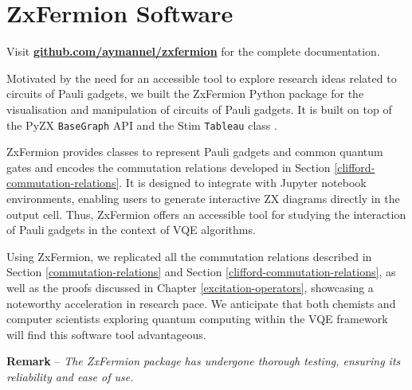 \chapter{ZxFermion Software}%
\label{zxfermion}

Visit \textbf{\href{https://github.com/aymannel/zxfermion}{github.com/aymannel/zxfermion} }for the complete documentation.

Motivated by the need for an accessible tool to explore research ideas related to circuits of Pauli gadgets, we built the ZxFermion Python package for the visualisation and manipulation of circuits of Pauli gadgets. It is built on top of the PyZX \lstinline{BaseGraph} API \cite{Kissinger2020} and the Stim \lstinline{Tableau} class \cite{Gidney2021}.

ZxFermion provides classes to represent Pauli gadgets and common quantum gates and encodes the commutation relations developed in Section \ref{clifford-commutation-relations}. It is designed to integrate with Jupyter notebook environments, enabling users to generate interactive ZX diagrams directly in the output cell. Thus, ZxFermion offers an accessible tool for studying the interaction of Pauli gadgets in the context of VQE algorithms.

Using ZxFermion, we replicated all the commutation relations described in Section \ref{commutation-relations} and Section \ref{clifford-commutation-relations}, as well as the proofs discussed in Chapter \ref{excitation-operators}, showcasing a noteworthy acceleration in research pace. We anticipate that both chemists and computer scientists exploring quantum computing within the VQE framework will find this software tool advantageous.

\hangindent=10pt 
\textbf{Remark} -- \textit{The ZxFermion package has undergone thorough testing, ensuring its reliability and ease of use.}

